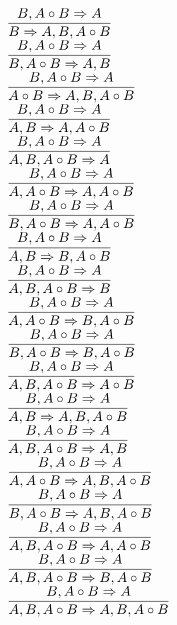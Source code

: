 \documentclass[11pt]{article}
\begin{document}
\begin{center}
\bigskip
\\$\infer{B\Rightarrow A, B, A\circ B}{B, A\circ B\Rightarrow A}$
\bigskip
\\$\infer{B, A\circ B\Rightarrow A, B}{B, A\circ B\Rightarrow A}$
\bigskip
\\$\infer{A\circ B\Rightarrow A, B, A\circ B}{B, A\circ B\Rightarrow A}$
\bigskip
\\$\infer{A, B\Rightarrow A, A\circ B}{B, A\circ B\Rightarrow A}$
\bigskip
\\$\infer{A, B, A\circ B\Rightarrow A}{B, A\circ B\Rightarrow A}$
\bigskip
\\$\infer{A, A\circ B\Rightarrow A, A\circ B}{B, A\circ B\Rightarrow A}$
\bigskip
\\$\infer{B, A\circ B\Rightarrow A, A\circ B}{B, A\circ B\Rightarrow A}$
\bigskip
\\$\infer{A, B\Rightarrow B, A\circ B}{B, A\circ B\Rightarrow A}$
\bigskip
\\$\infer{A, B, A\circ B\Rightarrow B}{B, A\circ B\Rightarrow A}$
\bigskip
\\$\infer{A, A\circ B\Rightarrow B, A\circ B}{B, A\circ B\Rightarrow A}$
\bigskip
\\$\infer{B, A\circ B\Rightarrow B, A\circ B}{B, A\circ B\Rightarrow A}$
\bigskip
\\$\infer{A, B, A\circ B\Rightarrow A\circ B}{B, A\circ B\Rightarrow A}$
\bigskip
\\$\infer{A, B\Rightarrow A, B, A\circ B}{B, A\circ B\Rightarrow A}$
\bigskip
\\$\infer{A, B, A\circ B\Rightarrow A, B}{B, A\circ B\Rightarrow A}$
\bigskip
\\$\infer{A, A\circ B\Rightarrow A, B, A\circ B}{B, A\circ B\Rightarrow A}$
\bigskip
\\$\infer{B, A\circ B\Rightarrow A, B, A\circ B}{B, A\circ B\Rightarrow A}$
\bigskip
\\$\infer{A, B, A\circ B\Rightarrow A, A\circ B}{B, A\circ B\Rightarrow A}$
\bigskip
\\$\infer{A, B, A\circ B\Rightarrow B, A\circ B}{B, A\circ B\Rightarrow A}$
\bigskip
\\$\infer{A, B, A\circ B\Rightarrow A, B, A\circ B}{B, A\circ B\Rightarrow A}$
\bigskip
\\
\end{center}
\end{document}
